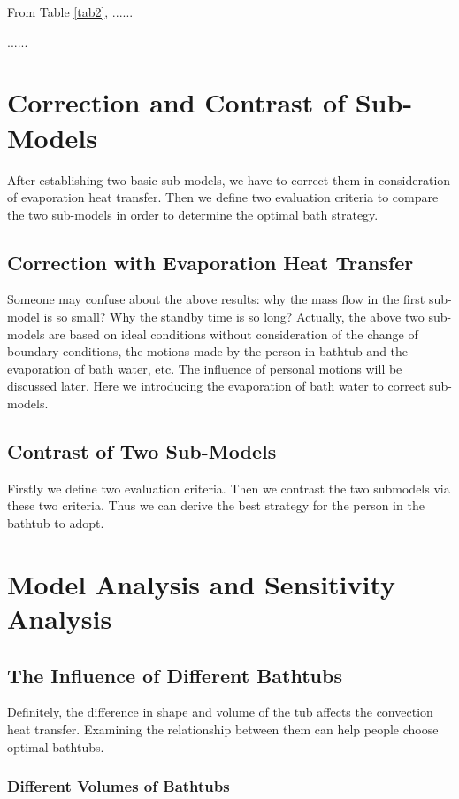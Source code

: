 From Table \ref{tab2}, ......

......

\section{Correction and Contrast of Sub-Models}

After establishing two basic sub-models, we have to correct them in consideration of evaporation heat transfer. Then we define two evaluation criteria to compare the two sub-models in order to determine the optimal bath strategy.

\subsection{Correction with Evaporation Heat Transfer}

Someone may confuse about the above results: why the mass flow in the first sub-model is so small? Why the standby time is so long? Actually, the above two sub-models are based on ideal conditions without consideration of the change of boundary conditions, the motions made by the person in bathtub and the evaporation of bath water, etc. The influence of personal motions will be discussed later. Here we introducing the evaporation of bath water to correct sub-models.

\subsection{Contrast of Two Sub-Models}

Firstly we define two evaluation criteria. Then we contrast the two submodels via these two criteria. Thus we can derive the best strategy for the person in the bathtub to adopt.

\section{Model Analysis and Sensitivity Analysis}

\subsection{The Influence of Different Bathtubs}

Definitely, the difference in shape and volume of the tub affects the
convection heat transfer. Examining the relationship between them can help
people choose optimal bathtubs.

\subsubsection{Different Volumes of Bathtubs}

